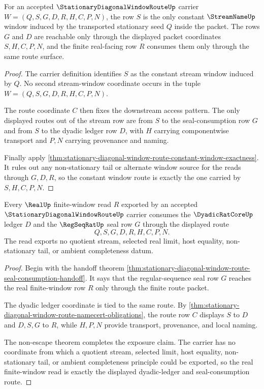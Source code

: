 \begin{theorem}
\label{thm:stationary-diagonal-window-route-constant-window-routing}
For an accepted $\StationaryDiagonalWindowRouteUp$ carrier $W=(Q,S,G,D,R,H,C,P,N)$, the row $S$ is the only constant $\StreamNameUp$ window induced by the transported stationary seed $Q$ inside the packet. The rows $G$ and $D$ are reachable only through the displayed packet coordinates $S,H,C,P,N$, and the finite real-facing row $R$ consumes them only through the same route surface.
\end{theorem}
\begin{proof}
The carrier definition identifies $S$ as the constant stream window induced by $Q$. No second stream-window coordinate occurs in the tuple $W=(Q,S,G,D,R,H,C,P,N)$.

The route coordinate $C$ then fixes the downstream access pattern. The only displayed routes out of the stream row are from $S$ to the seal-consumption row $G$ and from $S$ to the dyadic ledger row $D$, with $H$ carrying componentwise transport and $P,N$ carrying provenance and naming.

Finally apply \autoref{thm:stationary-diagonal-window-route-constant-window-exactness}. It rules out any non-stationary tail or alternate window source for the reads through $G,D,R$, so the constant window route is exactly the one carried by $S,H,C,P,N$.
\end{proof}

\begin{theorem}
\label{thm:stationary-diagonal-window-route-dyadic-ledger-exposure}
Every $\RealUp$ finite-window read $R$ exported by an accepted $\StationaryDiagonalWindowRouteUp$ carrier consumes the $\DyadicRatCoreUp$ ledger $D$ and the $\RegSeqRatUp$ seal row $G$ through the displayed route
$$
Q,S,G,D,R,H,C,P,N.
$$
The read exports no quotient stream, selected real limit, host equality, non-stationary tail, or ambient completeness datum.
\end{theorem}
\begin{proof}
Begin with the handoff theorem \autoref{thm:stationary-diagonal-window-route-seal-consumption-handoff}. It says that the regular-sequence seal row $G$ reaches the real finite-window row $R$ only through the finite route packet.

The dyadic ledger coordinate is tied to the same route. By \autoref{thm:stationary-diagonal-window-route-namecert-obligations}, the route row $C$ displays $S$ to $D$ and $D,S,G$ to $R$, while $H,P,N$ provide transport, provenance, and local naming.

The non-escape theorem completes the exposure claim. The carrier has no coordinate from which a quotient stream, selected limit, host equality, non-stationary tail, or ambient completeness principle could be exported, so the real finite-window read is exactly the displayed dyadic-ledger and seal-consumption route.
\end{proof}

